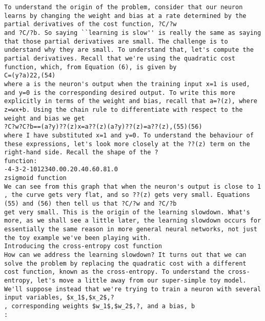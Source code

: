 \begin{lstlisting}
To understand the origin of the problem, consider that our neuron learns by changing the weight and bias at a rate determined by the partial derivatives of the cost function, ?C/?w
and ?C/?b. So saying ``learning is slow'' is really the same as saying that those partial derivatives are small. The challenge is to understand why they are small. To understand that, let's compute the partial derivatives. Recall that we're using the quadratic cost function, which, from Equation (6), is given by 
C=(y?a)22,(54)
where a is the neuron's output when the training input x=1 is used, and y=0 is the corresponding desired output. To write this more explicitly in terms of the weight and bias, recall that a=?(z), where z=wx+b. Using the chain rule to differentiate with respect to the weight and bias we get 
?C?w?C?b==(a?y)??(z)x=a??(z)(a?y)??(z)=a??(z),(55)(56)
where I have substituted x=1 and y=0. To understand the behaviour of these expressions, let's look more closely at the ??(z) term on the right-hand side. Recall the shape of the ?
function:
-4-3-2-1012340.00.20.40.60.81.0
zsigmoid function
We can see from this graph that when the neuron's output is close to 1
, the curve gets very flat, and so ??(z) gets very small. Equations (55) and (56) then tell us that ?C/?w and ?C/?b
get very small. This is the origin of the learning slowdown. What's more, as we shall see a little later, the learning slowdown occurs for essentially the same reason in more general neural networks, not just the toy example we've been playing with.
Introducing the cross-entropy cost function
How can we address the learning slowdown? It turns out that we can solve the problem by replacing the quadratic cost with a different cost function, known as the cross-entropy. To understand the cross-entropy, let's move a little away from our super-simple toy model. We'll suppose instead that we're trying to train a neuron with several input variables, $x_1$,$x_2$,?
, corresponding weights $w_1$,$w_2$,?, and a bias, b
: 


\end{lstlisting}
